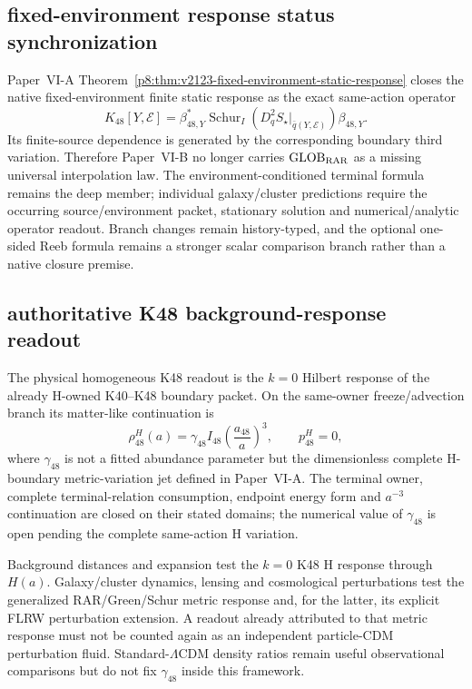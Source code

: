 \documentclass[12pt,a4paper]{article}
\begin{document}
\subsection{fixed-environment response status synchronization}
\label{p9:sec:v192-fixed-environment-response-sync}
Paper~VI-A Theorem~\ref{p8:thm:v2123-fixed-environment-static-response}
closes the native fixed-environment finite static response as the exact
same-action operator
\[
 K_{48}[Y,\mathcal E]
 =\beta_{48,Y}^{*}
 \operatorname{Schur}_{I}
 \!\left(D_q^2S_\star|_{\bar q(Y,\mathcal E)}\right)
 \beta_{48,Y}.
\]
Its finite-source dependence is generated by the corresponding boundary third
variation.  Therefore Paper~VI-B no longer carries
$\mathrm{GLOB}_{\rm RAR}$ as a missing universal interpolation law.  The
environment-conditioned terminal formula remains the deep member; individual
galaxy/cluster predictions require the occurring source/environment packet,
stationary solution and numerical/analytic operator readout.  Branch changes
remain history-typed, and the optional one-sided Reeb formula remains a
stronger scalar comparison branch rather than a native closure premise.


\subsection{authoritative K48 background-response readout}
\label{p9:sec:v1104-k48-background-readout-correction}

\begin{corollary}
\label{p9:cor:v1104-k48-background-response-readout}
The physical homogeneous K48 readout is the $k=0$ Hilbert response of the
already H-owned K40--K48 boundary packet.  On the same-owner freeze/advection
branch its matter-like continuation is
\[
 \boxed{\rho_{48}^{H}(a)
 =\gamma_{48}I_{48}\left(\frac{a_{48}}a\right)^3,
 \qquad p_{48}^{H}=0,}
\]
where $\gamma_{48}$ is not a fitted abundance parameter but the dimensionless
complete H-boundary metric-variation jet defined in Paper~VI-A.  The terminal
owner, complete terminal-relation consumption, endpoint energy form and
$a^{-3}$ continuation are closed on their stated domains; the numerical value
of $\gamma_{48}$ is open pending the complete same-action H variation.
\end{corollary}

\begin{remark}
\label{p9:rem:v1104-k48-rar-no-double-counting}
Background distances and expansion test the $k=0$ K48 H response through
$H(a)$.  Galaxy/cluster dynamics, lensing and cosmological perturbations test
the generalized RAR/Green/Schur metric response and, for the latter, its
explicit FLRW perturbation extension.  A readout already attributed to that
metric response must not be counted again as an independent particle-CDM
perturbation fluid.  Standard-$\Lambda$CDM density ratios remain useful
observational comparisons but do not fix $\gamma_{48}$ inside this framework.
\end{remark}
\end{document}
